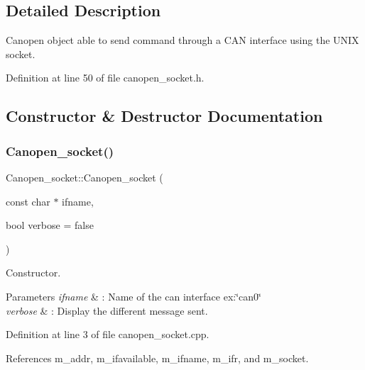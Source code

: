 \subsection{Detailed Description}
Canopen object able to send command through a C\+AN interface using the U\+N\+IX socket. 

Definition at line 50 of file canopen\+\_\+socket.\+h.



\subsection{Constructor \& Destructor Documentation}
\mbox{\label{class_canopen__socket_a5ac330ffe00a414d7b2a1e393b3f2113}} 
\subsubsection{\texorpdfstring{Canopen\+\_\+socket()}{Canopen\_socket()}\hspace{0.1cm}{\footnotesize\ttfamily [1/2]}}
{\footnotesize\ttfamily Canopen\+\_\+socket\+::\+Canopen\+\_\+socket (\begin{DoxyParamCaption}\item[{const char $\ast$}]{ifname,  }\item[{bool}]{verbose = {\ttfamily false} }\end{DoxyParamCaption})}



Constructor. 


\begin{DoxyParams}{Parameters}
{\em ifname} & \+: Name of the can interface ex\+:\char`\"{}can0\char`\"{} \\
\hline
{\em verbose} & \+: Display the different message sent. \\
\hline
\end{DoxyParams}


Definition at line 3 of file canopen\+\_\+socket.\+cpp.



References m\+\_\+addr, m\+\_\+ifavailable, m\+\_\+ifname, m\+\_\+ifr, and m\+\_\+socket.

\mbox{\label{class_canopen__socket_a897638e8ede53e4302568a66c87eb914}} 
